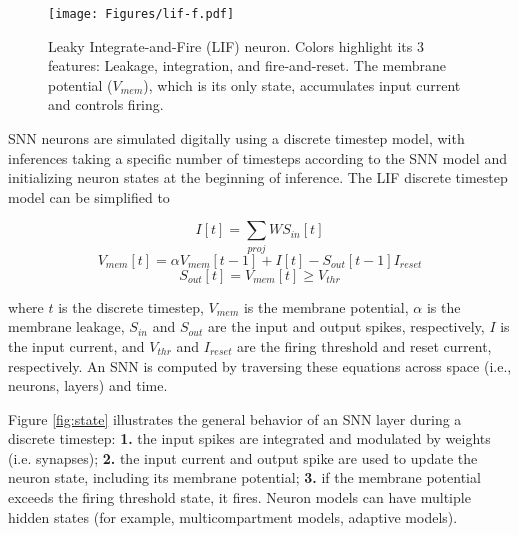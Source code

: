 \begin{figure}[!t]
\centering
\texttt{[image: Figures/lif-f.pdf]}
\caption{Leaky Integrate-and-Fire (LIF) neuron. Colors highlight its 3 features: Leakage, integration, and fire-and-reset. The membrane potential ($V_{mem}$), which is its only state, accumulates input current and controls firing.}%
\label{fig:lif}
\end{figure}

SNN neurons are simulated digitally using a discrete timestep model, with inferences taking a specific number of timesteps according to the SNN model and initializing neuron states at the beginning of inference.
The LIF discrete timestep model can be simplified to

\begin{equation}
    I[t] = \sum_{proj}{W S_{in}[t]}
\end{equation}
\begin{equation}
V_{mem}[t] = \alpha V_{mem}[t-1] + I[t] - S_{out}[t-1] I_{reset}
\end{equation}
 \begin{equation}
S_{out}[t] = V_{mem}[t] \geq V_{thr} 
 \end{equation}

where $t$ is the discrete timestep, $V_{mem}$ is the membrane potential, $\alpha$ is the membrane leakage, $S_{in}$ and $S_{out}$ are the input and output spikes, respectively, $I$ is the input current, and $V_{thr}$ and $I_{reset}$ are the firing threshold and reset current, respectively. An SNN is computed by traversing these equations across space (i.e., neurons, layers) and time.

Figure \ref{fig:state} illustrates the general behavior of an SNN layer during a discrete timestep: \textbf{1.} the input spikes are integrated and modulated by weights (i.e. synapses); \textbf{2.} the input current and output spike are used to update the neuron state, including its membrane potential; \textbf{3.} if the membrane potential exceeds the firing threshold state, it fires. Neuron models can have multiple hidden states (for example, multicompartment models, adaptive models\cite{gerstner2014neuronal}).

